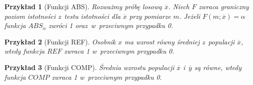 \documentclass[12pt,a4paper]{report}
\newtheorem{przyklad}{Przykład}
\begin{document}
\begin{przyklad}[Funkcji ABS]
Rozważmy próbę losową $\overline{x}$. Niech $F$ zwraca graniczny poziom istotności z~testu istotności dla $\overline{x}$ przy pomiarze $m$. Jeżeli $ F(m;\overline{x})=\alpha$ funkcja $ABS_{\alpha}$ zwróci 1 oraz~w~przeciwnym przypadku 0.
\end{przyklad}
\begin{przyklad}[Funkcji REF]
Osobnik $x$ ma wzrost równy średniej z~populacji $\overline{x}$, wtedy funkcja $REF$ zwraca 1 w~przeciwnym przypadku 0.
\end{przyklad}
\begin{przyklad}[Funkcji COMP]
Średnia wzrostu populacji $\overline{x}$ i~$\overline{y}$ są równe, wtedy funkcja $COMP$ zwraca 1 w~przeciwnym przypadku 0.
\end{przyklad}
\end{document}
